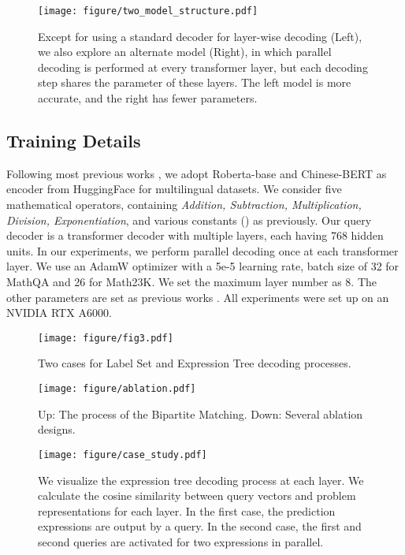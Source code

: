 \documentclass[11pt]{article}
\begin{document}
\label{sec:appendix}
\begin{figure}[t] \centering \texttt{[image: figure/two\_model\_structure.pdf]} \caption{Except for using a standard decoder for layer-wise decoding (Left), we also explore an alternate model (Right), in which parallel decoding is performed at every  transformer layer, but each decoding step shares the parameter of these  layers. The left model is more accurate, and the right has fewer parameters.} \label{Fig.two_models} \end{figure}




\subsection{Training Details} \label{training details}
Following most previous works \citep{zhang-etal-2022-multi-view,jie-etal-2022-learning}, we adopt Roberta-base and Chinese-BERT as encoder from HuggingFace \citep{wolf-etal-2020-transformers} for multilingual datasets. We consider five mathematical operators, containing \emph{Addition, Subtraction, Multiplication, Division, Exponentiation}, and various constants () as previously. Our query decoder is a transformer decoder with multiple layers, each having 768 hidden units. In our experiments, we perform parallel decoding once at each transformer layer. We use an AdamW optimizer with a 5e-5 learning rate, batch size of 32 for MathQA and 26 for Math23K. We set the maximum layer number as 8. The other parameters are set as previous works \citep{zhang-etal-2022-multi-view,jie-etal-2022-learning}. All experiments were set up on an NVIDIA RTX A6000. 





\begin{figure*}[t] \centering \texttt{[image: figure/fig3.pdf]} \caption{Two cases for Label Set and Expression Tree decoding processes.} \label{Fig.f3} \end{figure*}


\begin{figure*}[t] \centering \texttt{[image: figure/ablation.pdf]} \caption{Up: The process of the Bipartite Matching. Down: Several ablation designs.} \label{Fig.ablation} \end{figure*}



\begin{figure*}[!htb] \centering \texttt{[image: figure/case\_study.pdf]} \caption{We visualize the expression tree decoding process at each layer. We calculate the cosine similarity between query vectors and problem representations for each layer. In the first case, the prediction expressions are output by a query. In the second case, the first and second queries are activated for two expressions in parallel.} \label{Fig.case_study} \end{figure*}
\end{document}

